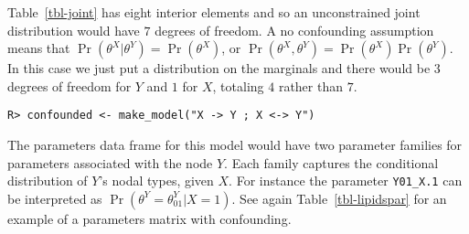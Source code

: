\documentclass[
  11pt,
  article]{jss}
\begin{document}
Table~\ref{tbl-joint} has eight interior elements and so an
unconstrained joint distribution would have \(7\) degrees of freedom. A
no confounding assumption means that
\(\Pr(\theta^X | \theta^Y) = \Pr(\theta^X)\), or
\(\Pr(\theta^X, \theta^Y) = \Pr(\theta^X)\Pr(\theta^Y)\). In this case
we just put a distribution on the marginals and there would be \(3\)
degrees of freedom for \(Y\) and \(1\) for \(X\), totaling \(4\) rather
than \(7\).

\begin{verbatim}
R> confounded <- make_model("X -> Y ; X <-> Y")
\end{verbatim}

\hypertarget{tbl-confound-params-df}{}
\begin{table}[H]
\caption{\label{tbl-confound-params-df}Parameters Data Frame for Model with Confounding. }\tabularnewline

\centering
{}
\end{table}

The parameters data frame for this model would have two parameter
families for parameters associated with the node \(Y\). Each family
captures the conditional distribution of \(Y\)'s nodal types, given
\(X\). For instance the parameter \texttt{Y01\_X.1} can be interpreted
as \(\Pr(\theta^Y = \theta^Y_{01} | X=1)\). See again
Table~\ref{tbl-lipidspar} for an example of a parameters matrix with
confounding.
\end{document}
